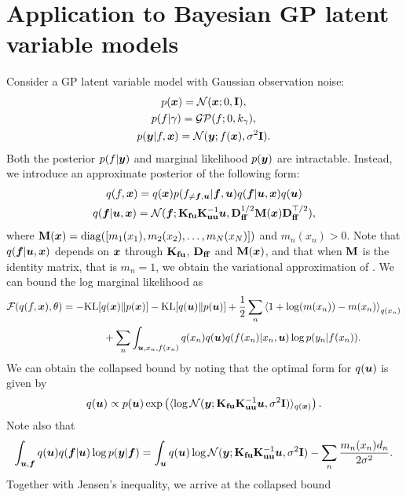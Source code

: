 \section{Application to Bayesian GP latent variable models}
\label{sec:lvm}
Consider a GP latent variable model \citep[GPLVM;][]{lawrence05} with Gaussian observation noise:
\begin{gather}
    p({\bm{x}}) = {\mathcal{N}}({\bm{x}}; 0, {\mathbf{I}}), \nonumber\\
    p(f | \gamma) = \mathcal{GP}(f; 0, k_{\gamma}), \nonumber\\
    p({\bm{y}} | f, {\bm{x}}) = {\mathcal{N}}({\bm{y}}; f({\bm{x}}), \sigma^2{\mathbf{I}}). \nonumber
\end{gather}
Both the posterior $p(f | {\bm{y}})$ and marginal likelihood $p({\bm{y}})$ are intractable. Instead, we introduce an approximate posterior of the following form:
\begin{gather}
    q(f, {\bm{x}}) = q({\bm{x}}) p(f_{\neq {\bm{f}}, {\bm{u}}} | {\bm{f}}, {\bm{u}}) q({\bm{f}} | {\bm{u}}, {\bm{x}}) q({\bm{u}}) \nonumber\\
    q({\bm{f}} | {\bm{u}}, {\bm{x}}) = {\mathcal{N}}({\bm{f}}; \mathbf{K}_{\mathbf{fu}} \mathbf{K}_{\mathbf{uu}}^{-1} {\bm{u}}, \mathbf{D}_{\mathbf{ff}}^{1/2} {\mathbf{M}}({\bm{x}}) \mathbf{D}_{\mathbf{ff}}^{\top/2}),\nonumber
\end{gather}
where ${\mathbf{M}}({\bm{x}}) = \mathrm{diag}([m_1(x_1), m_2(x_2), \dots, m_N(x_N)])$ and $m_n(x_n) > 0$. Note that $q({\bm{f}} | {\bm{u}}, {\bm{x}})$ depends on ${\bm{x}}$ through $\mathbf{K}_{\mathbf{fu}}$, $\mathbf{D}_{\mathbf{ff}}$ and ${\mathbf{M}}({\bm{x}})$, and that when ${\mathbf{M}}$ is the identity matrix, that is $m_n = 1$, we obtain the variational approximation of \cite{damianou16a}. We can bound the log marginal likelihood as
\begin{align}
    {\mathcal{F}}(q(f, {\bm{x}}), \theta) &= -\mathrm{KL} [q({\bm{x}}) \| p({\bm{x}})] -\mathrm{KL} [q({\bm{u}}) \| p({\bm{u}})] + \frac{1}{2} \sum_n \left \langle 1 + \log(m(x_n)) - m(x_n)\right\rangle_{q(x_n)} \nonumber\\
    & \qquad\qquad + \sum_n \int_{{\bm{u}}, x_n, f(x_n)} q(x_n)q({\bm{u}})q(f(x_n) | x_n, {\bm{u}}) \log p(y_n | f(x_n)). \nonumber
\end{align}
We can obtain the collapsed bound by noting that the optimal form for $q({\bm{u}})$ is given by
\begin{equation}
    q({\bm{u}}) \propto p({\bm{u}}) \exp\left(\langle \log {\mathcal{N}}({\bm{y}}; \mathbf{K}_{\mathbf{fu}} \mathbf{K}_{\mathbf{uu}}^{-1} {\bm{u}}, \sigma^2 {\mathbf{I}}) \rangle_{q({\bm{x}})} \right). \nonumber
\end{equation}
Note also that
\begin{equation}
    \int_{{\bm{u}}, {\bm{f}}} q({\bm{u}}) q({\bm{f}} | {\bm{u}}) \log p({\bm{y}} | {\bm{f}}) = \int_{{\bm{u}}} q({\bm{u}}) \log {\mathcal{N}}({\bm{y}}; \mathbf{K}_{\mathbf{fu}} \mathbf{K}_{\mathbf{uu}}^{-1} {\bm{u}}, \sigma^2 {\mathbf{I}}) - \sum_n \frac{m_n(x_n) d_n}{2\sigma^2}. \nonumber
\end{equation}
Together with Jensen's inequality, we arrive at the collapsed bound
